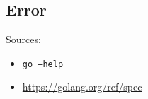 \documentclass{article}
\begin{document}
\begin{multicols*}{3}
  \filbreak
  \section*{Error}

  \parbox{\columnwidth}{
    Sources:
    \begin{itemize}[nosep]
    \item \texttt{go --help}
    \item \url{https://golang.org/ref/spec}
    \end{itemize}

    \vspace{\baselineskip}
    \begin{center}
      \doclicenseText\\[0.25\baselineskip]

      \doclicenseImage
    \end{center}
  }
\end{multicols*}
\end{document}

